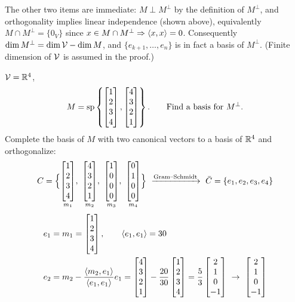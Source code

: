 \begin{insight}
The other two items are immediate: $M\perp M^\perp$ by the definition of $M^\perp$, and orthogonality implies linear independence (shown above), equivalently $M\cap M^\perp=\{0_V\}$ since $x\in M\cap M^\perp\Rightarrow\left\langle x, x \right\rangle=0$. Consequently $\dim M^\perp=\dim\mathcal{V}-\dim M$, and $\{e_{k+1},\dots,e_n\}$ is in fact a basis of $M^\perp$. (Finite dimension of $\mathcal{V}$ is assumed in the proof.)
\end{insight}

\begin{example}
$\mathcal{V}=\mathbb{R}^4$,
\[
M=\operatorname{sp}\left\{\begin{bmatrix}1\\2\\3\\4\end{bmatrix},\begin{bmatrix}4\\3\\2\\1\end{bmatrix}\right\}. \qquad \text{Find a basis for } M^\perp.
\]
Complete the basis of $M$ with two canonical vectors to a basis of $\mathbb{R}^4$ and orthogonalize:
\[
C=\Big\{\underset{m_1}{\bmat{1\\2\\3\\4}},\ \underset{m_2}{\bmat{4\\3\\2\\1}},\ \underset{m_3}{\bmat{1\\0\\0\\0}},\ \underset{m_4}{\bmat{0\\1\\0\\0}}\Big\}
\ \xrightarrow{\text{Gram--Schmidt}}\ \bar C=\{e_1,e_2,e_3,e_4\}
\]
\begin{align*}
e_1&=m_1=\bmat{1\\2\\3\\4}, \qquad \inner{e_1}{e_1}=30\\
e_2&=m_2-\frac{\inner{m_2}{e_1}}{\inner{e_1}{e_1}}e_1=\bmat{4\\3\\2\\1}-\frac{20}{30}\bmat{1\\2\\3\\4}=\frac53\bmat{2\\1\\0\\-1}\ \to\ \bmat{2\\1\\0\\-1}\\

\end{align*}
\end{example}
